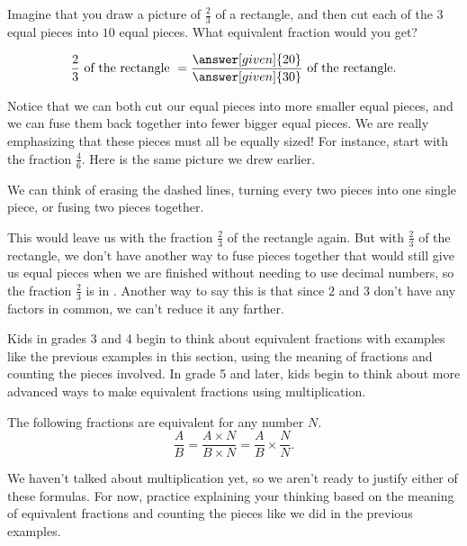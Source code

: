 \documentclass{ximera}
\begin{document}
\begin{question}
	Imagine that you draw a picture of $\frac{2}{3}$ of a rectangle, and then cut each of the $3$ equal pieces into $10$ equal pieces. What equivalent fraction would you get?
	
	\[
\frac{2}{3} \textrm{ of the rectangle } = \frac{\answer[given]{20}}{\answer[given]{30}} \textrm{ of the rectangle.}
\]
\end{question}

Notice that we can both cut our equal pieces into more smaller equal pieces, and we can fuse them back together into fewer bigger equal pieces. We are really emphasizing that these pieces must all be equally sized! For instance, start with the fraction $\frac{4}{6}$. Here is the same picture we drew earlier.

\begin{image}  \end{image}

We can think of erasing the dashed lines, turning every two pieces into one single piece, or fusing two pieces together.

\begin{image}  \end{image}

This would leave us with the fraction $\frac{2}{3}$ of the rectangle again. But with $\frac{2}{3}$ of the rectangle, we don't have another way to fuse pieces together that would still give us equal pieces when we are finished without needing to use decimal numbers, so the fraction $\frac{2}{3}$ is in . Another way to say this is that since $2$ and $3$ don't have any factors in common, we can't reduce it any farther.

Kids in grades 3 and 4 begin to think about equivalent fractions with examples like the previous examples in this section, using the meaning of fractions and counting the pieces involved. In grade 5 and later, kids begin to think about more advanced ways to make equivalent fractions using multiplication.  

\begin{theorem}
	The following fractions are equivalent for any number $N$.
	\[
	\frac{A}{B} = \frac{A \times N}{B \times N} = \frac{A}{B} \times \frac{N}{N}.
	\]
\end{theorem}


We haven't talked about multiplication yet, so we aren't ready to justify either of these formulas. For now, practice explaining your thinking based on the meaning of equivalent fractions and counting the pieces like we did in the previous examples.
\end{document}
